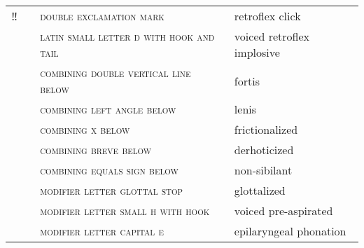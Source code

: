 \label{tab:ipa_additions}
 \tablelasttail{\bottomrule}

\begin{center}
\begin{xtabular}{ l L{1.1cm} L{6.1cm} L{3.5cm} }
‼ &  & \textsc{double exclamation mark} & retroflex click \\
 &  & \textsc{latin small letter d with hook and tail} & voiced retroflex implosive \\
 &  & \textsc{combining double vertical line below} & fortis \\
 &  & \textsc{combining left angle below} & lenis \\
 &  & \textsc{combining x below} & frictionalized \\
 &  & \textsc{combining breve below} & derhoticized \\
 &  & \textsc{combining equals sign below} & non-sibilant \\
 &  & \textsc{modifier letter glottal stop} & glottalized \\
 &  & \textsc{modifier letter small h with hook} & voiced pre-aspirated \\
 &  & \textsc{modifier letter capital e} & epilaryngeal phonation \\
\end{xtabular}
\end{center}